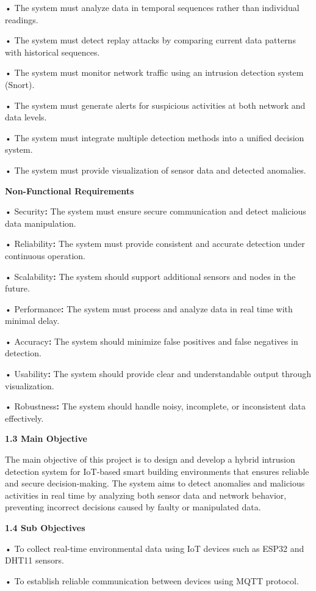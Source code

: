• The system must analyze data in temporal sequences rather than
individual readings.

• The system must detect replay attacks by comparing current data
patterns with historical sequences.

• The system must monitor network traffic using an intrusion detection
system (Snort).

• The system must generate alerts for suspicious activities at both
network and data levels.

• The system must integrate multiple detection methods into a unified
decision system.

• The system must provide visualization of sensor data and detected
anomalies.

\textbf{Non-Functional Requirements}

• Security\textbf{:} The system must ensure secure communication and
detect malicious data manipulation.

• Reliability\textbf{:} The system must provide consistent and accurate
detection under continuous operation.

• Scalability\textbf{:} The system should support additional sensors and
nodes in the future.

• Performance\textbf{:} The system must process and analyze data in real
time with minimal delay.

• Accuracy\textbf{:} The system should minimize false positives and
false negatives in detection.

• Usability\textbf{:} The system should provide clear and understandable
output through visualization.

• Robustness\textbf{:} The system should handle noisy, incomplete, or
inconsistent data effectively.

\textbf{1.3 Main Objective}

The main objective of this project is to design and develop a hybrid
intrusion detection system for IoT-based smart building environments
that ensures reliable and secure decision-making. The system aims to
detect anomalies and malicious activities in real time by analyzing both
sensor data and network behavior, preventing incorrect decisions caused
by faulty or manipulated data.

\textbf{1.4 Sub Objectives}

• To collect real-time environmental data using IoT devices such as
ESP32 and DHT11 sensors.

• To establish reliable communication between devices using MQTT
protocol.

